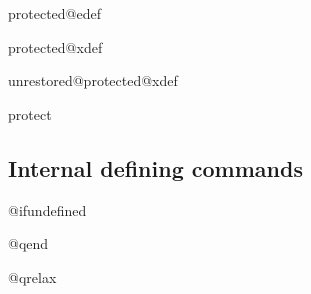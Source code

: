 %
\begin{docCommand}{protected@edef}{}
\begin{docCommand}{protected@xdef}{}
\end{docCommand}
\end{docCommand}
\begin{docCommand}{unrestored@protected@xdef}{}
\end{docCommand}
%
%
\begin{docCommand}{protect}{}
\begin{teX}
\set@typeset@protect
\end{teX}
\end{docCommand}
%
\subsection{Internal defining commands}
%
\begin{docCommand}{@ifundefined}{}
\begin{teX}
\def\@ifundefined#1{%
  \expandafter\ifx\csname#1\endcsname\relax
    \expandafter\@firstoftwo
  \else
    \expandafter\@secondoftwo
  \fi}
\end{teX}
\end{docCommand}
%
%
\begin{docCommand}{@qend}{}
\begin{docCommand}{@qrelax}{}
\begin{teX}
\edef\@qend{\expandafter\@cdr\string\end\@nil}
\edef\@qrelax{\expandafter\@cdr\string\relax\@nil}
\end{teX}
\end{docCommand}
\end{docCommand}


